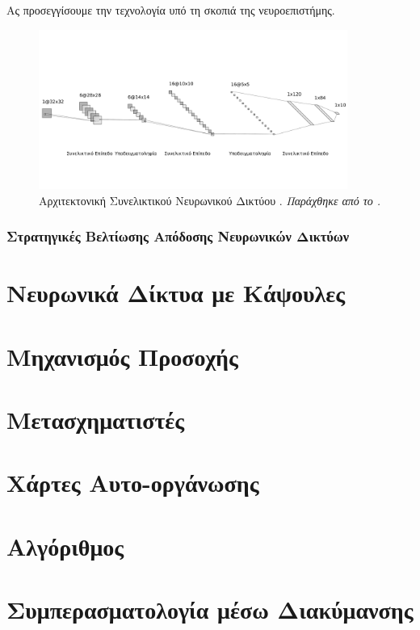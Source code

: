 Ας προσεγγίσουμε την τεχνολογία υπό τη σκοπιά της νευροεπιστήμης.
 
\begin{figure}[h]
  \centering
  \includegraphics[width=0.9\textwidth]{images/chapter theoritical background/lenet-greek-new.pdf}
  \caption{Αρχιτεκτονική Συνελικτικού Νευρωνικού Δικτύου \cite{lenet}. \textit{Παράχθηκε από το \href{http://alexlenail.me/NN-SVG/LeNet.html}{}.}}
  \label{fig:_nn_lenet}
\end{figure}
\subsubsection{Στρατηγικές Βελτίωσης Απόδοσης Νευρωνικών Δικτύων}
\section{Νευρωνικά Δίκτυα με Κάψουλες}
\section{Μηχανισμός Προσοχής}
\section{Μετασχηματιστές}
\section{Χάρτες Αυτο-οργάνωσης}
\label{sec:_SOM}
\section{Αλγόριθμος }
\label{sec:_EM}
\section{Συμπερασματολογία μέσω Διακύμανσης}
